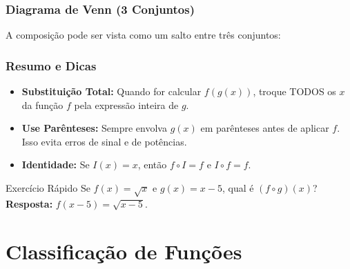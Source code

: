 \documentclass[9pt]{beamer}
\begin{document}
\begin{frame}
\frametitle{Diagrama de Venn (3 Conjuntos)}
A composição pode ser vista como um salto entre três conjuntos:

\centering
{}
\end{frame}

\begin{frame}
\frametitle{Resumo e Dicas}
\begin{itemize}
    \item \textbf{Substituição Total:} Quando for calcular $f(g(x))$, troque TODOS os $x$ da função $f$ pela expressão inteira de $g$.
    \item \textbf{Use Parênteses:} Sempre envolva $g(x)$ em parênteses antes de aplicar $f$. Isso evita erros de sinal e de potências.
    \item \textbf{Identidade:} Se $I(x) = x$, então $f \circ I = f$ e $I \circ f = f$.
\end{itemize}

\begin{exampleblock}{Exercício Rápido}
Se $f(x) = \sqrt{x}$ e $g(x) = x - 5$, qual é $(f \circ g)(x)$? \\
\textbf{Resposta:} $f(x-5) = \sqrt{x-5}$.
\end{exampleblock}
\end{frame}

\section{Classificação de Funções}
\end{document}
